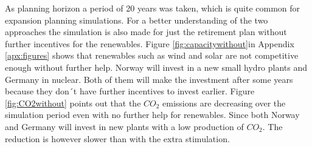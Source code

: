 \documentclass{article}
\begin{document}
As planning horizon a period of 20 years was taken, which is quite common for expansion planning simulations. For a better understanding of the two approaches the simulation is also made for just the retirement plan without further incentives for the renewables. Figure \ref{fig:capacitywithout}in Appendix  \ref{apx:figures} shows that renewables such as wind and solar are not competitive enough without further help.  Norway will invest in a new small hydro plants and Germany in nuclear. Both of them will make the investment after some years because they don´t have further incentives to invest earlier. Figure \ref{fig:CO2without} points out that the $CO_2$ emissions are decreasing over the simulation period even with no further help for renewables. Since both Norway and Germany will invest in new plants with a low production of $CO_2$. The reduction is however slower than with the extra stimulation.



\newpage
\clearpage
\thispagestyle{empty}
\end{document}
